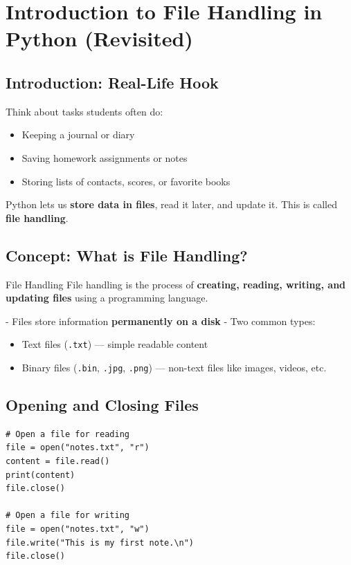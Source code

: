 \chapter{Introduction to File Handling in Python (Revisited)}

\section{Introduction: Real-Life Hook}

Think about tasks students often do:

\begin{itemize}
    \item Keeping a journal or diary  
    \item Saving homework assignments or notes  
    \item Storing lists of contacts, scores, or favorite books  
\end{itemize}

Python lets us \textbf{store data in files}, read it later, and update it. This is called \textbf{file handling}.

\section{Concept: What is File Handling?}

\begin{definition}{File Handling}
File handling is the process of \textbf{creating, reading, writing, and updating files} using a programming language.
\end{definition}

- Files store information \textbf{permanently on a disk}  
- Two common types:  
  \begin{itemize}
    \item Text files (\texttt{.txt}) — simple readable content  
    \item Binary files (\texttt{.bin}, \texttt{.jpg}, \texttt{.png}) — non-text files like images, videos, etc.  
  \end{itemize}

\section{Opening and Closing Files}

\begin{verbatim}
# Open a file for reading
file = open("notes.txt", "r")
content = file.read()
print(content)
file.close()

# Open a file for writing
file = open("notes.txt", "w")
file.write("This is my first note.\n")
file.close()
\end{verbatim}


